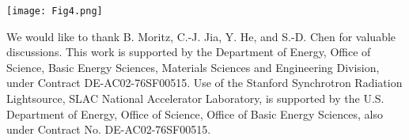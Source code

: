 \documentclass[journal=nalefd,manuscript=letter]{achemso}
\begin{document}
\begin{figure*}
\centering
\texttt{[image: Fig4.png]}
\caption{\label{fig:4}(a-f) ARPES intensity mapping near $E = E_F$ for an energy window of 10 meV, measured at 20 K. The Brilloin zone of bulk TiSe$_2$ is plotted in red for comparison. (a) Se:TiO$_2$, quenched to 30 $^\circ$C immediately after growth; (b) Se:TiO$_2$, annealed at 390 $^\circ$C; (c) TiSe$_2$/TiO$_2$,9ML, quenched to 120 $^\circ$C; (d) TiSe$_2$/TiO2, 15ML, annealed at 280 $^\circ$C; (e) TiSe$_2$/graphene, 1ML, annealed at 220 $^\circ$C; (f) TiSe$_2$/graphene, 1ML, annealed at 280 $^\circ$C. (g) The relationship between doping level and annealing temperature for Se:TiO$_2$, TiSe$_2$/TiO$_2$ and TiSe$_2$/graphene. The red line is a guide of the eye indicating the separation between “Low Temperature Anneal” and “High Temperature Anneal”. All data taken with 82 eV photons.
}
\end{figure*}



\pagebreak

\begin{acknowledgement}
We would like to thank B. Moritz, C.-J. Jia, Y. He, and S.-D. Chen for valuable discussions. 
This work is supported by the Department of Energy,  Office of Science, Basic Energy Sciences, Materials Sciences and Engineering Division, under Contract DE-AC02-76SF00515.
Use of the Stanford Synchrotron Radiation Lightsource, SLAC National Accelerator Laboratory, is supported by the U.S. Department of Energy, Office of Science, Office of Basic Energy Sciences, also under Contract No. DE-AC02-76SF00515.
\end{acknowledgement}

\end{document}
